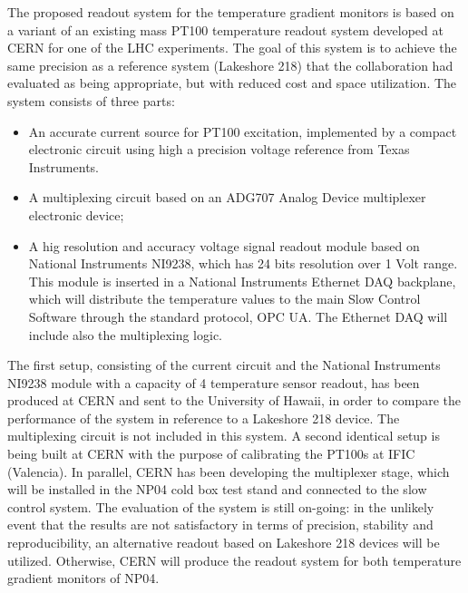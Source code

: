 The proposed readout system for the temperature gradient monitors is based on a variant of an existing mass PT100 temperature readout system developed at CERN for one of the LHC experiments. 
The goal of this system is to achieve the same precision as a reference system (Lakeshore 218) that the collaboration had evaluated as being appropriate,
but with reduced cost and space utilization.
The system consists of three parts:
\begin{itemize}
\item An accurate current source for PT100 excitation, implemented by a compact electronic circuit using high a precision voltage reference from Texas Instruments. 
\item A multiplexing circuit based on an ADG707 Analog Device multiplexer electronic device;
\item A hig resolution and accuracy voltage signal readout module based on National Instruments NI9238, which has 24 bits resolution over 1 Volt range.
  This module is inserted in a National Instruments Ethernet DAQ backplane, which will distribute the temperature values to the main Slow Control Software
  through the standard protocol, OPC UA. The Ethernet DAQ will include also the multiplexing logic.
\end{itemize}
  The first setup, consisting of the current circuit and the National Instruments NI9238 module with a capacity of 4 temperature sensor readout,
  has been produced at CERN and sent to the University of Hawaii, in order to compare the performance of the system in reference to a Lakeshore 218 device.
  The multiplexing circuit is not included in this system.        
  A second identical setup is being built at CERN with the purpose of calibrating the PT100s at IFIC (Valencia). In parallel, CERN has been developing the multiplexer stage,
  which will be installed in the NP04 cold box test stand and connected to the slow control system.
  The evaluation of the system is still on-going: in the unlikely event that the results are not satisfactory in terms of precision, stability and reproducibility,
  an alternative readout based on Lakeshore 218 devices will be utilized. Otherwise, CERN will produce the readout system for both temperature gradient monitors of NP04.
